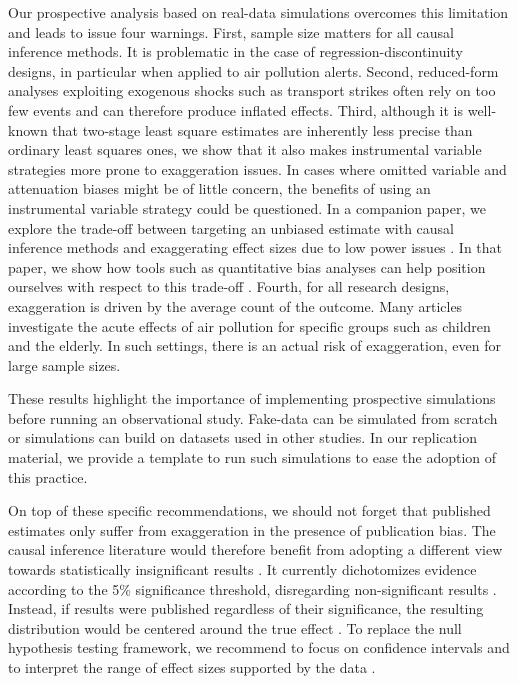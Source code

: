 \documentclass[12pt]{article}
\begin{document}
        Our prospective analysis based on real-data simulations overcomes this limitation and leads to issue four warnings. First, sample size matters for all causal inference methods. It is problematic in the case of regression-discontinuity designs, in particular when applied to air pollution alerts. Second, reduced-form analyses exploiting exogenous shocks such as transport strikes often rely on too few events and can therefore produce inflated effects. Third, although it is well-known that two-stage least square estimates are inherently less precise than ordinary least squares ones, we show that it also makes instrumental variable strategies more prone to exaggeration issues. In cases where omitted variable and attenuation biases might be of little concern, the benefits of using an instrumental variable strategy could be questioned. In a companion paper, we explore the trade-off between targeting an unbiased estimate with causal inference methods and exaggerating effect sizes due to low power issues \citep{bagilet_causal_inflation_2022}. In that paper, we show how tools such as quantitative bias analyses can help position ourselves with respect to this trade-off \citep{oster2019unobservable, rosenbaum_design_2020, cinelli_making_2020}. Fourth, for all research designs, exaggeration is driven by the average count of the outcome. Many articles investigate the acute effects of air pollution for specific groups such as children and the elderly. In such settings, there is an actual risk of exaggeration, even for large sample sizes. 
        
        These results highlight the importance of implementing prospective simulations before running an observational study. Fake-data can be simulated from scratch or simulations can build on datasets used in other studies. In our replication material, we provide a template to run such simulations to ease the adoption of this practice.

        On top of these specific recommendations, we should not forget that published estimates only suffer from exaggeration in the presence of publication bias. The causal inference literature would therefore benefit from adopting a different view towards statistically insignificant results \citep{ziliak_cult_2008, wasserstein_asa_2016, mcshane_abandon_2019}. It currently dichotomizes evidence according to the 5\% significance threshold, disregarding non-significant results \citep{greenland_invited_2017}. Instead, if results were published regardless of their significance, the resulting distribution would be centered around the true effect \citep{hernan_causal_2022}. To replace the null hypothesis testing framework, we recommend to focus on confidence intervals and to interpret the range of effect sizes supported by the data \citep{amrhein_inferential_2019, romer2020praise}. 
        
\end{document}
